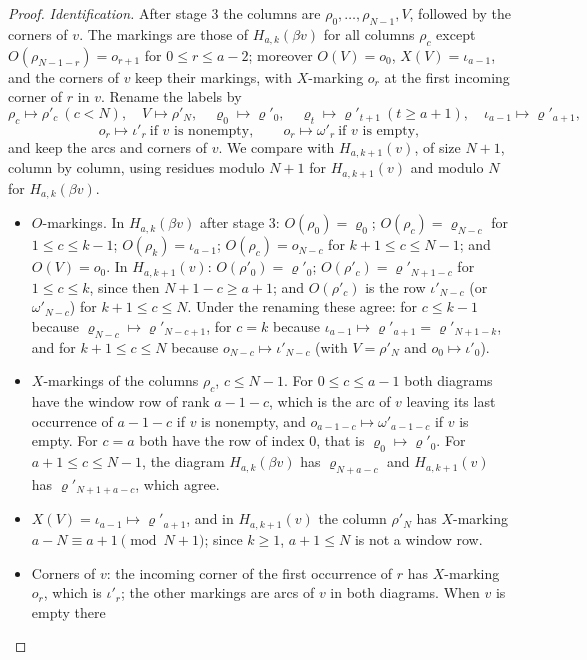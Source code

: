 \documentclass[11pt]{amsart}
\theoremstyle{definition}
\theoremstyle{remark}
\begin{document}
\begin{proof}
\emph{Identification.} After stage 3 the columns are $\rho_0,\dots,\rho_{N-1},V$, followed by the
corners of $v$. The markings are those of $H_{a,k}(\beta v)$ for all columns $\rho_c$ except
$O(\rho_{N-1-r})=o_{r+1}$ for $0\le r\le a-2$; moreover $O(V)=o_0$, $X(V)=\iota_{a-1}$, and the corners
of $v$ keep their markings, with $X$-marking $o_r$ at the first incoming corner of $r$ in $v$.
Rename the labels by
\[
\rho_c\mapsto\rho'_c\ (c<N),\quad V\mapsto\rho'_N,\quad \varrho_0\mapsto\varrho'_0,\quad
\varrho_t\mapsto\varrho'_{t+1}\ (t\ge a+1),\quad \iota_{a-1}\mapsto\varrho'_{a+1},
\]
\[
o_r\mapsto\iota'_r\ \text{if $v$ is nonempty},\qquad o_r\mapsto\omega'_r\ \text{if $v$ is empty},
\]
and keep the arcs and corners of $v$. We compare with $H_{a,k+1}(v)$, of size $N+1$, column by
column, using residues modulo $N+1$ for $H_{a,k+1}(v)$ and modulo $N$ for $H_{a,k}(\beta v)$.
\begin{itemize}
\item $O$-markings. In $H_{a,k}(\beta v)$ after stage 3: $O(\rho_0)=\varrho_0$;
$O(\rho_c)=\varrho_{N-c}$ for $1\le c\le k-1$; $O(\rho_k)=\iota_{a-1}$; $O(\rho_c)=o_{N-c}$ for
$k+1\le c\le N-1$; and $O(V)=o_0$. In $H_{a,k+1}(v)$: $O(\rho'_0)=\varrho'_0$;
$O(\rho'_c)=\varrho'_{N+1-c}$ for $1\le c\le k$, since then $N+1-c\ge a+1$; and $O(\rho'_c)$ is the
row $\iota'_{N-c}$ (or $\omega'_{N-c}$) for $k+1\le c\le N$. Under the renaming these agree: for
$c\le k-1$ because $\varrho_{N-c}\mapsto\varrho'_{N-c+1}$, for $c=k$ because
$\iota_{a-1}\mapsto\varrho'_{a+1}=\varrho'_{N+1-k}$, and for $k+1\le c\le N$ because
$o_{N-c}\mapsto\iota'_{N-c}$ (with $V=\rho'_N$ and $o_0\mapsto\iota'_0$).
\item $X$-markings of the columns $\rho_c$, $c\le N-1$. For $0\le c\le a-1$ both diagrams have the
window row of rank $a-1-c$, which is the arc of $v$ leaving its last occurrence of $a-1-c$ if $v$ is
nonempty, and $o_{a-1-c}\mapsto\omega'_{a-1-c}$ if $v$ is empty. For $c=a$ both have the row of
index $0$, that is $\varrho_0\mapsto\varrho'_0$. For $a+1\le c\le N-1$, the diagram
$H_{a,k}(\beta v)$ has $\varrho_{N+a-c}$ and $H_{a,k+1}(v)$ has $\varrho'_{N+1+a-c}$, which agree.
\item $X(V)=\iota_{a-1}\mapsto\varrho'_{a+1}$, and in $H_{a,k+1}(v)$ the column $\rho'_N$ has
$X$-marking $a-N\equiv a+1\pmod{N+1}$; since $k\ge1$, $a+1\le N$ is not a window row.
\item Corners of $v$: the incoming corner of the first occurrence of $r$ has $X$-marking $o_r$,
which is $\iota'_r$; the other markings are arcs of $v$ in both diagrams. When $v$ is empty there

\end{itemize}
\end{proof}
\end{document}
